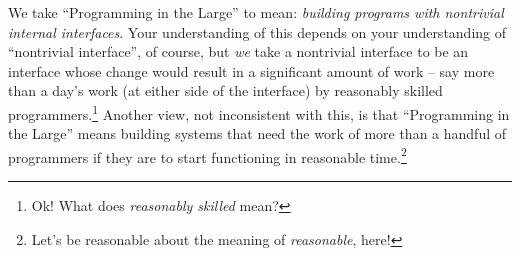 \documentclass{ip3}
\begin{document}


\begin{foil}

\begin{note}
      We take ``Programming in the Large'' to mean: \textit{building
      programs with nontrivial internal interfaces}. Your understanding of
      this depends on your understanding of ``nontrivial interface'', of
      course, but \textit{we} take a nontrivial interface to be an
      interface whose change would result in a significant amount of work
      -- say more than a day's work (at either side of the interface) by
      reasonably skilled programmers.\footnote{Ok! What does
      \textit{reasonably skilled} mean?} Another view, not inconsistent
      with this, is that ``Programming in the Large'' means building
      systems that need the work of more than a handful of programmers if
      they are to start functioning in reasonable time.\footnote{Let's be
      reasonable about the meaning of \textit{reasonable}, here!}

\end{note}


\end{foil}
\end{document}
